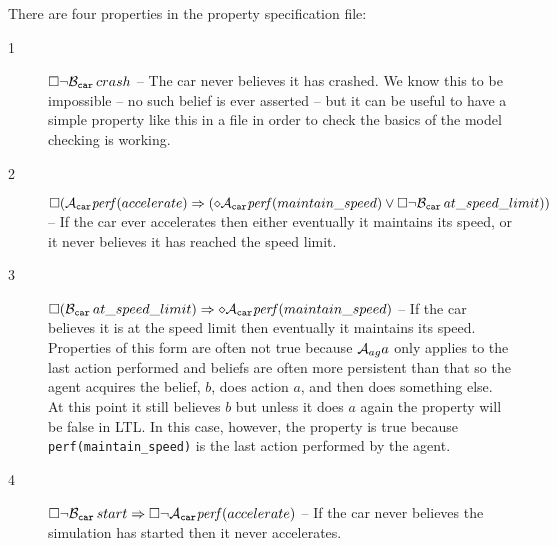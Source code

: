 There are four properties in the property specification file:
\begin{description}
\item[1] $\Box \neg \mathrm{{\cal B}}_{\texttt{car}} \, crash$ -- The car never believes it has crashed.  We know this to be impossible -- no such belief is ever asserted -- but it can be useful to have a simple property like this in a file in order to check the basics of the model checking is working.
\item[2] $\Box ( \mathrm{{\cal A}}_{\texttt{car}} \mathit{perf}(accelerate) \Rightarrow (\diamond \mathrm{{\cal A}}_{\texttt{car}} \mathit{perf}(maintain\_speed) \lor \Box  \neg \mathrm{{\cal B}}_{\texttt{car}} \, at\_speed\_limit))$ -- If the car ever accelerates then either eventually it maintains its speed, or it never believes it has reached the speed limit.
\item[3] $\Box ( \mathrm{{\cal B}}_{\texttt{car}} \, at\_speed\_limit) \Rightarrow \diamond \mathrm{{\cal A}}_{\texttt{car}} \mathit{perf}(maintain\_speed)$ -- If the car believes it is at the speed limit then eventually it maintains its speed.  Properties of this form are often not true because $\mathrm{{\cal A}}_{ag} a$ only applies to the last action performed and beliefs are often more persistent than that so the agent acquires the belief, $b$, does action $a$, and then does something else.  At this point it still believes $b$ but unless it does $a$ again the property will be false in LTL.  In this case, however, the property is true because \lstinline{perf(maintain_speed)} is the last action performed by the agent.
\item[4] $\Box \neg \mathrm{{\cal B}}_{\texttt{car}} \, start \Rightarrow \Box \neg \mathrm{{\cal A}}_{\texttt{car}} \mathit{perf}(accelerate)$ -- If the car never believes the simulation has started then it never accelerates.
\end{description}  

